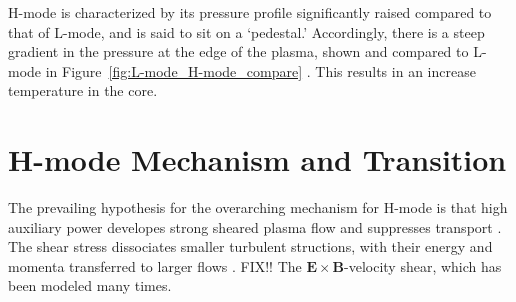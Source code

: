 H-mode is characterized by its pressure profile significantly raised compared to that of L-mode, and is said to sit on a `pedestal.'
Accordingly, there is a steep gradient in the pressure at the edge of the plasma, shown and compared to L-mode in Figure~\ref{fig:L-mode_H-mode_compare} \cite{weymiens_bifurcation_2014}.
This results in an increase temperature in the core.

\section{H-mode Mechanism and Transition}
The prevailing hypothesis for the overarching mechanism for H-mode is that high auxiliary power developes strong sheared plasma flow and suppresses transport \cite{freidberg_plasma_2007}.
The shear stress dissociates smaller turbulent structions, with their energy and momenta transferred to larger flows \cite{staps_backstepping_2017}.
FIX!! The $\mathbf{E}\times\mathbf{B}$-velocity shear, which has been modeled many times.

